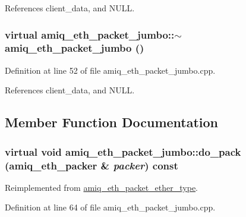 References client\_\-data, and NULL.\hypertarget{classamiq__eth__packet__jumbo_ad3d4e0fc8070e503c1848e18dd32eabc}{
\subsubsection[{$\sim$amiq\_\-eth\_\-packet\_\-jumbo}]{\setlength{\rightskip}{0pt plus 5cm}virtual amiq\_\-eth\_\-packet\_\-jumbo::$\sim$amiq\_\-eth\_\-packet\_\-jumbo ()}}
\label{classamiq__eth__packet__jumbo_ad3d4e0fc8070e503c1848e18dd32eabc}


Definition at line 52 of file amiq\_\-eth\_\-packet\_\-jumbo.cpp.

References client\_\-data, and NULL.

\subsection{Member Function Documentation}
\hypertarget{classamiq__eth__packet__jumbo_a1f2906c7128a79c356e152368584d2e8}{
\subsubsection[{do\_\-pack}]{\setlength{\rightskip}{0pt plus 5cm}virtual void amiq\_\-eth\_\-packet\_\-jumbo::do\_\-pack ({\bf amiq\_\-eth\_\-packer} \& {\em packer}) const}}
\label{classamiq__eth__packet__jumbo_a1f2906c7128a79c356e152368584d2e8}


Reimplemented from \hyperlink{classamiq__eth__packet__ether__type_a62fe5f26a466f0bd0045599b89aa6926}{amiq\_\-eth\_\-packet\_\-ether\_\-type}.

Definition at line 64 of file amiq\_\-eth\_\-packet\_\-jumbo.cpp.

